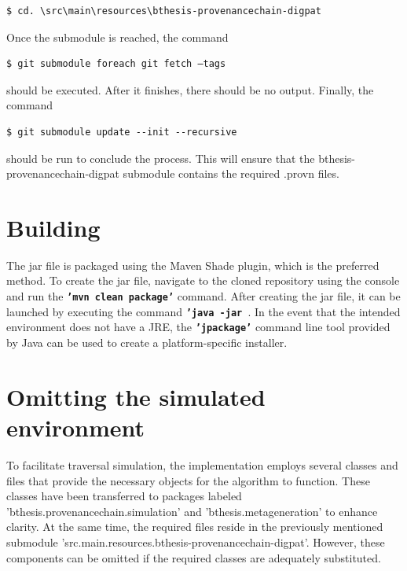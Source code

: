 \documentclass[
  digital,     %
  oneside,     %
  nosansbold,  %
  nocolorbold, %
  lof,         %
  lot,         %
]{fithesis4}
\begin{document}
\begin{verbatim}
$ cd. \src\main\resources\bthesis-provenancechain-digpat  
\end{verbatim}

Once the submodule is reached, the command 

\begin{verbatim}
$ git submodule foreach git fetch –tags
\end{verbatim}

should be executed. After it finishes, there should be no output. Finally, the command

\begin{verbatim}
$ git submodule update --init --recursive  
\end{verbatim}

should be run to conclude the process. This will ensure that the bthesis-provenancechain-digpat submodule contains the required .provn files.

\section{Building}
The jar file is packaged using the Maven Shade plugin, which is the preferred method. To create the jar file, navigate to the cloned repository using the console and run the \textbf{\texttt{'mvn clean package'}} command. After creating the jar file, it can be launched by executing the command \textbf{\texttt{'java -jar }}. In the event that the intended environment does not have a JRE, the \textbf{\texttt{'jpackage'}} command line tool provided by Java can be used to create a platform-specific installer.

\section{Omitting the simulated environment}
To facilitate traversal simulation, the implementation employs several classes and files that provide the necessary objects for the algorithm to function. These classes have been transferred to packages labeled 'bthesis.provenancechain.simulation' and 'bthesis.metageneration' to enhance clarity. At the same time, the required files reside in the previously mentioned submodule 'src.main.resources.bthesis-provenancechain-digpat'. However, these components can be omitted if the required classes are adequately substituted.
\shorthandon{-}
\end{document}
